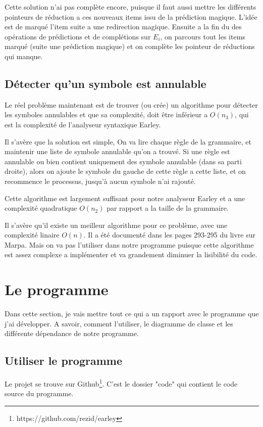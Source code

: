 \documentclass[10pt]{report}
\begin{document}
Cette solution n'ai pas complète encore, puisque il faut aussi mettre les différents pointeurs de réduction a ces nouveaux items issu de la prédiction magique. L'idée est de marqué l'item suite a une redirection magique. Ensuite a la fin du des opérations de prédictions et de complétions sur $E_i$, on parcours tout les items marqué (suite une prédiction magique) et on complète les pointeur de réductions qui manque.

\section{Détecter qu'un symbole est annulable}
Le réel problème maintenant est de trouver (ou crée) un algorithme pour détecter les symboles annulables et que sa complexité, doit être inférieur a $O(n_3)$, qui est la complexité de l'analyseur syntaxique Earley.

Il s'avère que la solution est simple, On va lire chaque règle de la grammaire, et maintenir une liste de symbole annulable qu'on a trouvé. Si une règle est annulable ou bien contient uniquement des symbole annulable (dans sa parti droite), alors on ajoute le symbole du gauche de cette règle a cette liste, et on recommence le processus, jusqu'à aucun symbole n'ai rajouté.

Cette algorithme est largement suffisant pour notre analyseur Earley et a une complexité quadratique $O(n_2)$ par rapport a la taille de la grammaire.

Il s'avère qu'il existe un meilleur algorithme pour ce problème, avec une complexité linaire $O(n)$. Il a été documenté dans les pages 293-295 du livre sur Marpa\cite{Marpa}. Mais on va pas l'utiliser dans notre programme puisque cette algorithme est assez complexe a implémenter et va grandement diminuer la lisibilité du code.

\chapter{Le programme}
Dans cette section, je vais mettre tout ce qui a un rapport avec le programme que j'ai développer. A savoir, comment l'utiliser, le diagramme de classe et les différente dépendance de notre programme.
\section{Utiliser le programme}
Le projet se trouve sur Github\footnote{https://github.com/rezid/earley}. C'est le dossier "code" qui contient le code source du programme.
\end{document}
